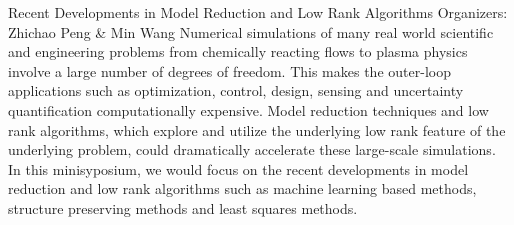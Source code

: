 \label{mini20}

\miniabs
{Recent Developments in Model Reduction and Low Rank Algorithms}
{Organizers: Zhichao Peng \& Min Wang}
{Numerical simulations of many real world scientific and engineering problems from chemically reacting flows to plasma physics involve a large number of degrees of freedom. This makes the outer-loop applications such as optimization, control, design, sensing and uncertainty quantification computationally expensive. Model reduction techniques and low rank algorithms, which explore and utilize the underlying low rank feature of the underlying problem, could dramatically accelerate these large-scale simulations. In this minisyposium, we would focus on the recent developments in model reduction and low rank algorithms such as machine learning based methods, structure preserving methods and least squares methods.}

